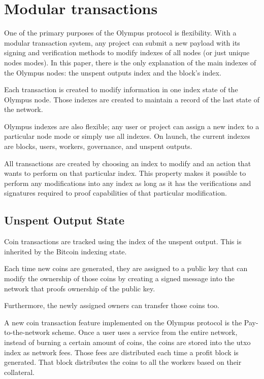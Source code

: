 \documentclass{article}
\begin{document}
	\section{Modular transactions}	
	
	One of the primary purposes of the Olympus protocol is flexibility. With a modular transaction system, any project can submit a new payload with its signing and verification methods to modify indexes of all nodes (or just unique nodes modes). In this paper, there is the only explanation of the main indexes of the Olympus nodes: the unspent outputs index and the block's index.
	
	Each transaction is created to modify information in one index state of the Olympus node. Those indexes are created to maintain a record of the last state of the network. 
	
	Olympus indexes are also flexible; any user or project can assign a new index to a particular node mode or simply use all indexes. On launch, the current indexes are blocks, users, workers, governance, and unspent outputs.
	
	All transactions are created by choosing an index to modify and an action that wants to perform on that particular index. This property makes it possible to perform any modifications into any index as long as it has the verifications and signatures required to proof capabilities of that particular modification.
	
	\subsection{Unspent Output State}
	
	Coin transactions are tracked using the index of the unspent output. This is inherited by the Bitcoin indexing state.
	
	Each time new coins are generated, they are assigned to a public key that can modify the ownership of those coins by creating a signed message into the network that proofs ownership of the public key.
	
	Furthermore, the newly assigned owners can transfer those coins too. 
	
	A new coin transaction feature implemented on the Olympus protocol is the Pay-to-the-network scheme. Once a user uses a service from the entire network, instead of burning a certain amount of coins, the coins are stored into the utxo index as network fees. Those fees are distributed each time a profit block is generated. That block distributes the coins to all the workers based on their collateral.
	
\end{document}
